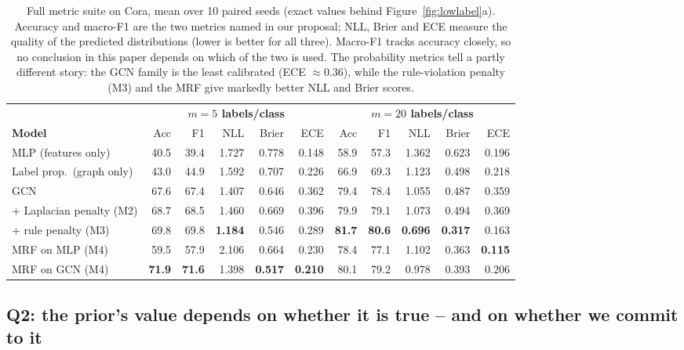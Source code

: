 \documentclass{article}
\begin{document}
\begin{table}[t]
\caption{Full metric suite on Cora, mean over 10 paired seeds (exact values behind
Figure~\ref{fig:lowlabel}a). Accuracy and macro-F1 are the two metrics named in our proposal;
NLL, Brier and ECE measure the quality of the predicted distributions (lower is better for all
three). Macro-F1 tracks accuracy closely, so no conclusion
in this paper depends on which of the two is used. The probability metrics tell a partly
different story: the GCN family is the least calibrated (ECE $\approx0.36$), while the
rule-violation penalty (M3) and the MRF give markedly better NLL and Brier scores.}
\label{tab:metrics}
\begin{center}
\footnotesize
\begin{tabular}{lrrrrr@{\hskip 1.2em}rrrrr}
\toprule
& \multicolumn{5}{c}{\textbf{$m=5$ labels/class}} & \multicolumn{5}{c}{\textbf{$m=20$ labels/class}} \\
\cmidrule(lr){2-6}\cmidrule(lr){7-11}
\textbf{Model} & Acc & F1 & NLL & Brier & ECE & Acc & F1 & NLL & Brier & ECE \\
\midrule
MLP (features only)      & 40.5 & 39.4 & 1.727 & 0.778 & 0.148 & 58.9 & 57.3 & 1.362 & 0.623 & 0.196 \\
Label prop.\ (graph only) & 43.0 & 44.9 & 1.592 & 0.707 & 0.226 & 66.9 & 69.3 & 1.123 & 0.498 & 0.218 \\
GCN                      & 67.6 & 67.4 & 1.407 & 0.646 & 0.362 & 79.4 & 78.4 & 1.055 & 0.487 & 0.359 \\
\;+ Laplacian penalty (M2) & 68.7 & 68.5 & 1.460 & 0.669 & 0.396 & 79.9 & 79.1 & 1.073 & 0.494 & 0.369 \\
\;+ rule penalty (M3)      & 69.8 & 69.8 & \textbf{1.184} & 0.546 & 0.289 & \textbf{81.7} & \textbf{80.6} & \textbf{0.696} & \textbf{0.317} & 0.163 \\
MRF on MLP (M4)          & 59.5 & 57.9 & 2.106 & 0.664 & 0.230 & 78.4 & 77.1 & 1.102 & 0.363 & \textbf{0.115} \\
MRF on GCN (M4)          & \textbf{71.9} & \textbf{71.6} & 1.398 & \textbf{0.517} & \textbf{0.210} & 80.1 & 79.2 & 0.978 & 0.393 & 0.206 \\
\bottomrule
\end{tabular}
\end{center}
\end{table}

\subsection{Q2: the prior's value depends on whether it is true -- and on whether we commit to it}
\label{sec:homophily}
\end{document}
